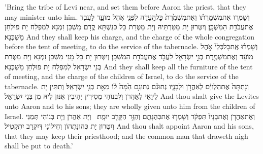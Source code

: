 {’Bring the tribe of Levi near, and set them before Aaron the priest, that they may minister unto him.}{}
{וְשָׁמְר֣וּ אֶת\maqqaf מִשְׁמַרְתּ֗וֹ וְאֶת\maqqaf מִשְׁמֶ֙רֶת֙ כׇּל\maqqaf הָ֣עֵדָ֔ה לִפְנֵ֖י אֹ֣הֶל מוֹעֵ֑ד לַעֲבֹ֖ד אֶת\maqqaf עֲבֹדַ֥ת הַמִּשְׁכָּֽן׃}
{וְיִטְּרוּן יָת מַטַּרְתֵּיהּ וְיָת מַטְּרַת כָּל כְּנִשְׁתָּא קֳדָם מַשְׁכַּן זִמְנָא לְמִפְלַח יָת פּוּלְחַן מַשְׁכְּנָא׃}
{And they shall keep his charge, and the charge of the whole congregation before the tent of meeting, to do the service of the tabernacle.}{}
{וְשָׁמְר֗וּ אֶֽת\maqqaf כׇּל\maqqaf כְּלֵי֙ אֹ֣הֶל מוֹעֵ֔ד וְאֶת\maqqaf מִשְׁמֶ֖רֶת בְּנֵ֣י יִשְׂרָאֵ֑ל לַעֲבֹ֖ד אֶת\maqqaf עֲבֹדַ֥ת הַמִּשְׁכָּֽן׃}
{וְיִטְּרוּן יָת כָּל מָנֵי מַשְׁכַּן זִמְנָא וְיָת מַטְּרַת בְּנֵי יִשְׂרָאֵל לְמִפְלַח יָת פּוּלְחַן מַשְׁכְּנָא׃}
{And they shall keep all the furniture of the tent of meeting, and the charge of the children of Israel, to do the service of the tabernacle.}{}
{וְנָתַתָּה֙ אֶת\maqqaf הַלְוִיִּ֔ם לְאַהֲרֹ֖ן וּלְבָנָ֑יו נְתוּנִ֨ם נְתוּנִ֥ם הֵ֙מָּה֙ ל֔וֹ מֵאֵ֖ת בְּנֵ֥י יִשְׂרָאֵֽל׃}
{וְתִתֵּין יָת לֵיוָאֵי לְאַהֲרֹן וְלִבְנוֹהִי מְסִירִין יְהִיבִין אִנּוּן לֵיהּ מִן בְּנֵי יִשְׂרָאֵל׃}
{And thou shalt give the Levites unto Aaron and to his sons; they are wholly given unto him from the children of Israel.}{}
{וְאֶת\maqqaf אַהֲרֹ֤ן וְאֶת\maqqaf בָּנָיו֙ תִּפְקֹ֔ד וְשָׁמְר֖וּ אֶת\maqqaf כְּהֻנָּתָ֑ם וְהַזָּ֥ר הַקָּרֵ֖ב יוּמָֽת׃ \petucha }
{וְיָת אַהֲרֹן וְיָת בְּנוֹהִי תְּמַנֵּי וְיִטְּרוּן יָת כְּהוּנַּתְהוֹן וְחִילוֹנַי דְּיִקְרַב יִתְקְטִיל׃}
{And thou shalt appoint Aaron and his sons, that they may keep their priesthood; and the common man that draweth nigh shall be put to death.’}{}
